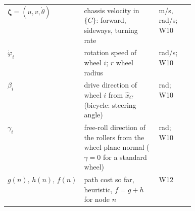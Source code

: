 \begin{multicols}{2}
\begin{fbx}
\begin{tabularx}{\linewidth}{@{}>{\raggedright\arraybackslash}p{0.24\linewidth}X>{\raggedright\arraybackslash}p{0.19\linewidth}@{}}
$\boldsymbol\zeta=(u,v,\dot\theta)$ & chassis velocity in $\{C\}$: forward, sideways, turning rate & m/s, rad/s; W10\\
$\dot\varphi_i$ & rotation speed of wheel $i$; $r$ wheel radius & rad/s; W10\\
$\beta_i$ & drive direction of wheel $i$ from $\hat x_C$ (bicycle: steering angle) & rad; W10\\
$\gamma_i$ & free-roll direction of the rollers from the wheel-plane normal ($\gamma=0$ for a standard wheel) & rad; W10\\
$g(n),\,h(n),\,f(n)$ & path cost so far, heuristic, $f=g+h$ for node $n$ & W12\\\bottomrule
\end{tabularx}
\end{fbx}
\end{multicols}
